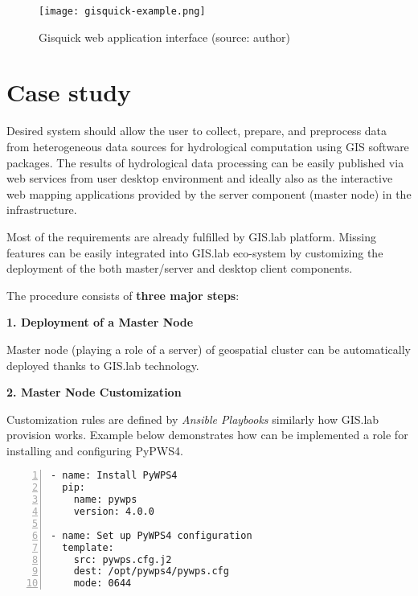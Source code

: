 \documentclass{tudelftposter}
\begin{document}
\vskip 0.25in

\begin{figure}[ht!]
\begin{center}
  \texttt{[image: gisquick-example.png]}
  \caption{Gisquick web application interface
    (source: author)}
\label{fig:gislab_infrastructure}
\end{center}
\end{figure}

\section{Case study}

Desired system should allow the user to collect, prepare, and
preprocess data from heterogeneous data sources for hydrological
computation using GIS software packages. The results of hydrological
data processing can be easily published via web services from user
desktop environment and ideally also as the interactive web mapping
applications provided by the server component (master node) in the
infrastructure.

Most of the requirements are already fulfilled by GIS.lab
platform. Missing features can be easily integrated into GIS.lab
eco-system by customizing the deployment of the both master/server and
desktop client components.

\vskip 0.4in

\noindent The procedure consists of \textbf{three major steps}:

\vskip 0.1in

\textbf{1. Deployment of  a Master Node}

Master node (playing a role of a server) of geospatial cluster can be
automatically deployed thanks to GIS.lab technology.

\vskip 0.1in

\textbf{2. Master Node Customization}

Customization rules are defined by \textit{Ansible Playbooks}
similarly how GIS.lab provision works. Example below demonstrates how
can be implemented a role for installing and configuring PyPWS4.

\begin{lstlisting}[numbers=left,xleftmargin=1em]
- name: Install PyWPS4
  pip:
    name: pywps
    version: 4.0.0

- name: Set up PyWPS4 configuration
  template:
    src: pywps.cfg.j2
    dest: /opt/pywps4/pywps.cfg
    mode: 0644
\end{lstlisting}
\end{document}
